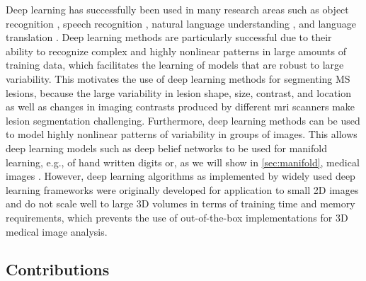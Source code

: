 Deep learning has successfully been used in many research areas such as object
recognition \citep{krizhevsky2012}, speech recognition \citep{hinton2012deep},
natural language understanding \citep{collobert2011natural}, and language
translation \citep{sutskever2014sequence}. Deep learning methods are
particularly successful due to their ability to recognize complex and highly
nonlinear patterns in large amounts of training data, which facilitates the
learning of models that are robust to large variability. This motivates the use
of deep learning methods for segmenting MS lesions, because the large
variability in lesion shape, size, contrast, and location as well as changes
in imaging contrasts produced by different \gls{mri} scanners make lesion
segmentation challenging. Furthermore, deep learning methods can
be used to model highly nonlinear patterns of variability in groups of images.
This allows deep learning models such as deep belief networks to be used for
manifold learning, e.g., of hand written digits \citep{hinton2006b} or, as we
will show in \ref{sec:manifold}, medical images \citep{brosch2013}. However,
deep learning algorithms as implemented by widely used deep learning frameworks
were originally developed for application to small 2D images and do not scale
well to large 3D volumes in terms of training time and memory requirements,
which prevents the use of out-of-the-box implementations for 3D medical image
analysis.

\subsection{Contributions}

